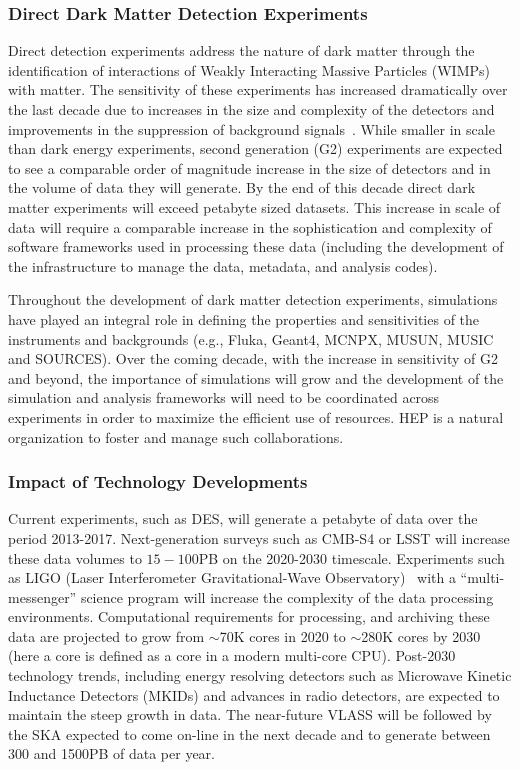 \subsubsection{Direct Dark Matter Detection
      Experiments}

Direct detection experiments address the nature of dark matter through
the identification of interactions of Weakly Interacting Massive
Particles (WIMPs) with matter.  The sensitivity of these experiments
has increased dramatically over the last decade due to increases in
the size and complexity of the detectors and improvements in the
suppression of background signals~\cite{dmrev}. While smaller in scale
than dark energy experiments, second generation (G2) experiments are
expected to see a comparable order of magnitude increase in the size
of detectors and in the volume of data they will generate. By the end
of this decade direct dark matter experiments will exceed petabyte
sized datasets.  This increase in scale of data will require a
comparable increase in the sophistication and complexity of software
frameworks used in processing these data (including the development of
the infrastructure to manage the data, metadata, and analysis codes).

Throughout the development of dark matter detection experiments,
simulations have played an integral role in defining the properties
and sensitivities of the instruments and backgrounds (e.g., Fluka,
Geant4, MCNPX, MUSUN, MUSIC and SOURCES). Over the coming decade, with
the increase in sensitivity of G2 and beyond, the importance of
simulations will grow and the development of the simulation and
analysis frameworks will need to be coordinated across experiments in
order to maximize the efficient use of resources. HEP is a natural
organization to foster and manage such collaborations.

\subsubsection{Impact of Technology Developments}

Current experiments, such as DES, will generate a petabyte of data
over the period 2013-2017. Next-generation surveys such as CMB-S4 or
LSST will increase these data volumes to $15-100$PB on the 2020-2030
timescale. Experiments such as LIGO (Laser Interferometer
Gravitational-Wave Observatory)~\cite{ligo} with a ``multi-messenger''
science program will increase the complexity of the data processing
environments.  Computational requirements for processing, and
archiving these data are projected to grow from $\sim$70K cores in
2020 to $\sim$280K cores by 2030 (here a core is defined as a core in
a modern multi-core CPU). Post-2030 technology trends, including
energy resolving detectors such as Microwave Kinetic Inductance
Detectors (MKIDs) and advances in radio detectors, are expected to
maintain the steep growth in data. The near-future VLASS will be
followed by the SKA expected to come on-line in the next decade and to generate
between 300 and 1500PB of data per year.


